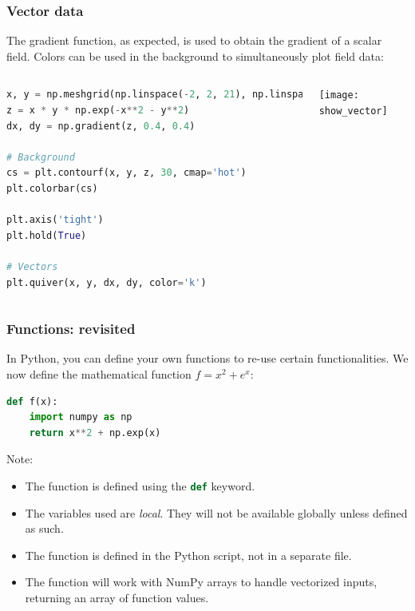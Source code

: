 \begin{frame}[fragile]
  \frametitle{Vector data}
  The gradient function, as expected, is used to obtain the gradient of a scalar field. Colors can be used in the background to simultaneously plot field data:
  \begin{columns}[T]
    \begin{lstlisting}[language=Python]
x, y = np.meshgrid(np.linspace(-2, 2, 21), np.linspace(-2, 2, 21))
z = x * y * np.exp(-x**2 - y**2)
dx, dy = np.gradient(z, 0.4, 0.4)

# Background
cs = plt.contourf(x, y, z, 30, cmap='hot')
plt.colorbar(cs)

plt.axis('tight')
plt.hold(True)

# Vectors
plt.quiver(x, y, dx, dy, color='k')
    \end{lstlisting}
   \begin{center}
      \texttt{[image: show\_vector]}
    \end{center}
  \end{columns}
\end{frame}

\begin{frame}[fragile]
  \frametitle{Functions: revisited}
  In Python, you can define your own functions to re-use certain functionalities. We now define the mathematical function \(f = x^2+e^x\):
  \begin{lstlisting}[language=Python]
def f(x):
    import numpy as np
    return x**2 + np.exp(x)
  \end{lstlisting}
  \pause
  Note:
  \begin{itemize}
    \item The function is defined using the \lstinline[language=Python]|def| keyword.
    \item The variables used are \emph{local}. They will not be available globally unless defined as such.
    \item The function is defined in the Python script, not in a separate file.
    \item The function will work with NumPy arrays to handle vectorized inputs, returning an array of function values.
  \end{itemize}
\end{frame}


